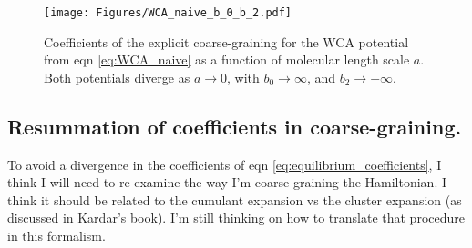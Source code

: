 \documentclass{article}
\begin{document}
\begin{figure}[t]
  \centering
  \texttt{[image: Figures/WCA\_naive\_b\_0\_b\_2.pdf]}
  \caption{Coefficients of the explicit coarse-graining for the WCA potential from
    eqn \ref{eq:WCA_naive} as a function of molecular length scale $a$. Both potentials diverge
    as $a\to 0$, with $b_0\to\infty$, and $b_2\to-\infty$.}\label{fig:WCA_naive}
\end{figure}


\subsection{Resummation of coefficients in coarse-graining.}

To avoid a divergence in the coefficients of eqn \ref{eq:equilibrium_coefficients}, I think I will
need to re-examine the way I'm coarse-graining the Hamiltonian. I think it should be related to the
cumulant expansion vs the cluster expansion (as discussed in Kardar's book). I'm still thinking on
how to translate that procedure in this formalism.
\end{document}
